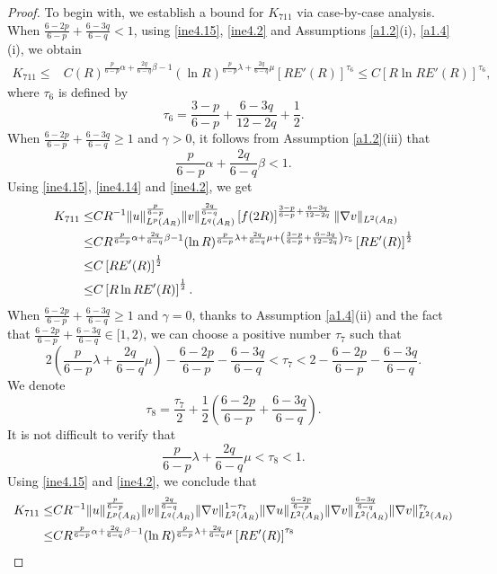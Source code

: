 \documentclass[10pt,a4paper]{amsart}
\begin{document}
\begin{proof}
To begin with, we establish a bound for $K_{711}$ via case-by-case analysis.
When $\frac{6-2p}{6-p} + \frac{6-3q}{6-q} < 1$, using \eqref{ine4.15}, \eqref{ine4.2} and Assumptions \ref{a1.2}(i), \ref{a1.4}(i), we obtain
\begin{align}\label{ine4.38}
	K_{711} \leq &C(R)^{\frac{p}{6-p}\alpha+\frac{2q}{6-q}\beta-1}(\ln R)^{\frac{p}{6-p}\lambda+\frac{2q}{6-q}\mu}\left[R E'(R)\right]^{\tau_6}\leq C\left[R \ln R E'(R)\right]^{\tau_6},
\end{align}
where $\tau_6$ is defined by
$$
\tau_6=\frac{3-p}{6-p}+\frac{6-3q}{12-2q}+\frac{1}{2}.
$$
When $\frac{6-2p}{6-p} + \frac{6-3q}{6-q}\geq1$ and $\gamma>0$, it follows from Assumption \ref{a1.2}(iii) that
$$
\frac{p}{6-p}\alpha+\frac{2q}{6-q}\beta<1.
$$
Using \eqref{ine4.15}, \eqref{ine4.14} and \eqref{ine4.2}, we get
\begin{align}\label{ine4.39}
K_{711} \leq&C R^{-1} \|u\|_{L^p(A_R)}^{\frac{p}{6-p}}\|v\|_{L^q(A_R)}^{\frac{2q}{6-q}}\left[f(2R)\right]^{\frac{3-p}{6-p}+\frac{6-3q}{12-2q}}\|\nabla v\|_{L^2(A_R)}\notag\\
\leq&C R^{\frac{p}{6-p}\alpha+\frac{2q}{6-q}\beta-1}(\ln R)^{\frac{p}{6-p}\lambda+\frac{2q}{6-q}\mu+\left(\frac{3-p}{6-p}+\frac{6-3q}{12-2q}\right)\tau_5} \left[RE'(R)\right]^{\frac{1}{2}}\notag\\
\leq&C\left[RE'(R)\right]^{\frac{1}{2}}\\
\leq&C\left[R\ln RE'(R)\right]^{\frac{1}{2}}.\notag
\end{align}
When $\frac{6-2p}{6-p} + \frac{6-3q}{6-q}\geq1$ and $\gamma=0$, thanks to Assumption \ref{a1.4}(ii) and the fact that $\frac{6-2p}{6-p} + \frac{6-3q}{6-q}\in[1,2)$, we can choose a positive number
$\tau_7$ such that
$$
2\left(\frac{p}{6-p}\lambda+\frac{2q}{6-q}\mu\right)-\frac{6-2p}{6-p}-\frac{6-3q}{6-q}<\tau_7<2-\frac{6-2p}{6-p} -\frac{6-3q}{6-q}.
$$
We denote
$$
\tau_8=\frac{\tau_7}{2}+\frac{1}{2}\left(\frac{6-2p}{6-p} + \frac{6-3q}{6-q}\right).
$$
It is not difficult to verify that
$$
\frac{p}{6-p}\lambda+\frac{2q}{6-q}\mu<\tau_8<1.
$$
Using \eqref{ine4.15} and \eqref{ine4.2}, we conclude that
\begin{align}\label{ine4.40}
K_{711} \leq&C R^{-1} \|u\|_{L^p(A_R)}^{\frac{p}{6-p}}\|v\|_{L^q(A_R)}^{\frac{2q}{6-q}}\|\nabla v\|_{L^2(A_R)}^{1-\tau_7}\|\nabla u\|_{L^2(A_R)}^{\frac{6-2p}{6-p}}\|\nabla v\|_{L^2(A_R)}^{\frac{6-3q}{6-q}}\|\nabla v\|_{L^2(A_R)}^{\tau_7}\notag\\
\leq&C R^{\frac{p}{6-p}\alpha+\frac{2q}{6-q}\beta-1}(\ln R)^{\frac{p}{6-p}\lambda+\frac{2q}{6-q}\mu} \left[RE'(R)\right]^{\tau_8}\\

\end{align}
\end{proof}
\end{document}
